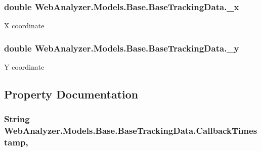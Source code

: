 \subsubsection[{\+\_\+x}]{\setlength{\rightskip}{0pt plus 5cm}double Web\+Analyzer.\+Models.\+Base.\+Base\+Tracking\+Data.\+\_\+x\hspace{0.3cm}{\ttfamily [protected]}}\label{class_web_analyzer_1_1_models_1_1_base_1_1_base_tracking_data_a38d492dc01a8dbba23ec635874808081}


X coordinate 

\hypertarget{class_web_analyzer_1_1_models_1_1_base_1_1_base_tracking_data_a435fc601a4a55e8ff46b1e42724cc269}{}
\subsubsection[{\+\_\+y}]{\setlength{\rightskip}{0pt plus 5cm}double Web\+Analyzer.\+Models.\+Base.\+Base\+Tracking\+Data.\+\_\+y\hspace{0.3cm}{\ttfamily [protected]}}\label{class_web_analyzer_1_1_models_1_1_base_1_1_base_tracking_data_a435fc601a4a55e8ff46b1e42724cc269}


Y coordinate 



\subsection{Property Documentation}
\hypertarget{class_web_analyzer_1_1_models_1_1_base_1_1_base_tracking_data_a90e9e6a31ed34b1a7b0bdfa10566ef31}{}
\subsubsection[{Callback\+Timestamp}]{\setlength{\rightskip}{0pt plus 5cm}String Web\+Analyzer.\+Models.\+Base.\+Base\+Tracking\+Data.\+Callback\+Timestamp\hspace{0.3cm}{\ttfamily [get]}, {\ttfamily [set]}}\label{class_web_analyzer_1_1_models_1_1_base_1_1_base_tracking_data_a90e9e6a31ed34b1a7b0bdfa10566ef31}


